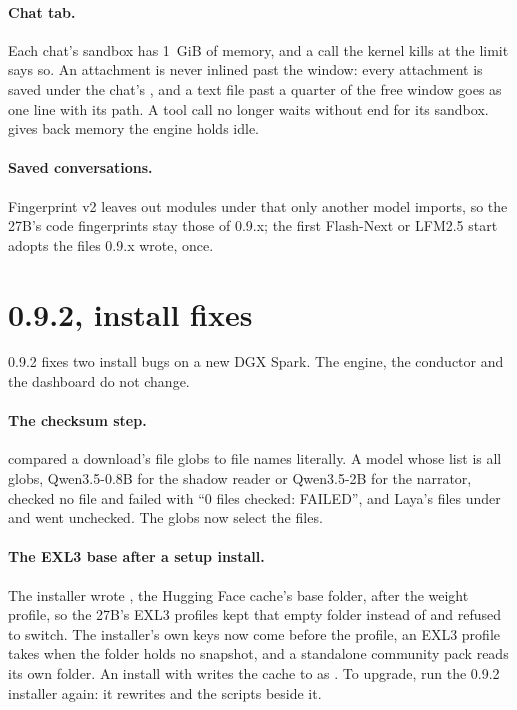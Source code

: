 \paragraph{Chat tab.} Each chat's sandbox has 1~GiB of memory, and a call the kernel kills at the limit says so. An attachment is never inlined past the window: every attachment is saved under the chat's , and a text file past a quarter of the free window goes as one line with its path. A tool call no longer waits without end for its sandbox.  gives back memory the engine holds idle.

\paragraph{Saved conversations.} Fingerprint v2 leaves out modules under  that only another model imports, so the 27B's code fingerprints stay those of 0.9.x; the first Flash-Next or LFM2.5 start adopts the files 0.9.x wrote, once.

\section{0.9.2, install fixes}\label{sec:changelog-092}

0.9.2 fixes two install bugs on a new DGX Spark. The engine, the conductor and the dashboard do not change.

\paragraph{The checksum step.}  compared a download's file globs to file names literally. A model whose list is all globs, Qwen3.5-0.8B for the shadow reader or Qwen3.5-2B for the narrator, checked no file and failed with \enquote{0 files checked: FAILED}, and Laya's files under  and  went unchecked. The globs now select the files.

\paragraph{The EXL3 base after a setup install.} The installer wrote , the Hugging Face cache's base folder, after the weight profile, so the 27B's EXL3 profiles kept that empty folder instead of  and  refused to switch. The installer's own keys now come before the profile, an EXL3 profile takes  when the folder holds no snapshot, and a standalone community pack reads its own folder. An install with  writes the cache to  as . To upgrade, run the 0.9.2 installer again: it rewrites  and the scripts beside it.

